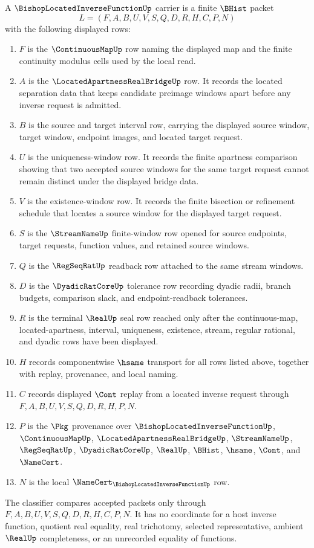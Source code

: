 \begin{definition}\label{def:bishops-located-inverse-function-carrier}
A $\BishopLocatedInverseFunctionUp$ carrier is a finite $\BHist$ packet
$$
L=(F,A,B,U,V,S,Q,D,R,H,C,P,N)
$$
with the following displayed rows:
\begin{enumerate}
\item $F$ is the $\ContinuousMapUp$ row naming the displayed map and the finite continuity modulus cells used by the local read.
\item $A$ is the $\LocatedApartnessRealBridgeUp$ row. It records the located separation data that keeps candidate preimage windows apart before any inverse request is admitted.
\item $B$ is the source and target interval row, carrying the displayed source window, target window, endpoint images, and located target request.
\item $U$ is the uniqueness-window row. It records the finite apartness comparison showing that two accepted source windows for the same target request cannot remain distinct under the displayed bridge data.
\item $V$ is the existence-window row. It records the finite bisection or refinement schedule that locates a source window for the displayed target request.
\item $S$ is the $\StreamNameUp$ finite-window row opened for source endpoints, target requests, function values, and retained source windows.
\item $Q$ is the $\RegSeqRatUp$ readback row attached to the same stream windows.
\item $D$ is the $\DyadicRatCoreUp$ tolerance row recording dyadic radii, branch budgets, comparison slack, and endpoint-readback tolerances.
\item $R$ is the terminal $\RealUp$ seal row reached only after the continuous-map, located-apartness, interval, uniqueness, existence, stream, regular rational, and dyadic rows have been displayed.
\item $H$ records componentwise $\hsame$ transport for all rows listed above, together with replay, provenance, and local naming.
\item $C$ records displayed $\Cont$ replay from a located inverse request through $F,A,B,U,V,S,Q,D,R,H,P,N$.
\item $P$ is the $\Pkg$ provenance over $\BishopLocatedInverseFunctionUp$, $\ContinuousMapUp$, $\LocatedApartnessRealBridgeUp$, $\StreamNameUp$, $\RegSeqRatUp$, $\DyadicRatCoreUp$, $\RealUp$, $\BHist$, $\hsame$, $\Cont$, and $\NameCert$.
\item $N$ is the local $\NameCert_{\BishopLocatedInverseFunctionUp}$ row.
\end{enumerate}
The classifier compares accepted packets only through $F,A,B,U,V,S,Q,D,R,H,C,P,N$. It has no coordinate for a host inverse function, quotient real equality, real trichotomy, selected representative, ambient $\RealUp$ completeness, or an unrecorded equality of functions.
\end{definition}
